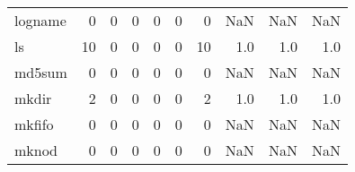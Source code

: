 \begin{tabular}{lrrrrrrrrr}
logname   &                                                  0 &                                                  0 &                                                  0 &                                                  0 &                                                  0 &                                                  0 &                                                NaN &                                    NaN &                                  NaN \\
ls        &                                                 10 &                                                  0 &                                                  0 &                                                  0 &                                                  0 &                                                 10 &                                                1.0 &                                    1.0 &                                  1.0 \\
md5sum    &                                                  0 &                                                  0 &                                                  0 &                                                  0 &                                                  0 &                                                  0 &                                                NaN &                                    NaN &                                  NaN \\
mkdir     &                                                  2 &                                                  0 &                                                  0 &                                                  0 &                                                  0 &                                                  2 &                                                1.0 &                                    1.0 &                                  1.0 \\
mkfifo    &                                                  0 &                                                  0 &                                                  0 &                                                  0 &                                                  0 &                                                  0 &                                                NaN &                                    NaN &                                  NaN \\
mknod     &                                                  0 &                                                  0 &                                                  0 &                                                  0 &                                                  0 &                                                  0 &                                                NaN &                                    NaN &                                  NaN \\

\end{tabular}

